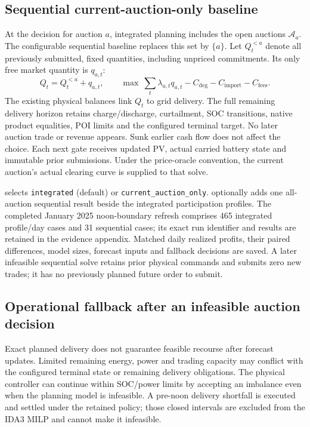 \documentclass[11pt,a4paper]{article}
\begin{document}
\subsection{Sequential current-auction-only baseline}

At the decision for auction $a$, integrated planning includes the open auctions
$\mathcal A_a$. The configurable sequential baseline replaces this set by
$\{a\}$. Let $Q_t^{<a}$ denote all previously submitted, fixed quantities,
including unpriced commitments. Its only free market quantity is $q_{a,t}$:
\begin{equation}
 Q_t=Q_t^{<a}+q_{a,t},\qquad
 \max\ \sum_t \lambda_{a,t}q_{a,t}
       -C_{\mathrm{deg}}-C_{\mathrm{import}}-C_{\mathrm{fees}}.
\end{equation}
The existing physical balances link $Q_t$ to grid delivery. The full remaining
delivery horizon retains charge/discharge, curtailment, SOC transitions, native
product equalities, POI limits and the configured terminal target. No later
auction trade or revenue appears. Sunk earlier cash flow does not affect the
choice. Each next gate receives updated PV, actual carried battery state and
immutable prior submissions. Under the price-oracle convention, the current
auction's actual clearing curve is supplied to that solve.

 selects
\texttt{integrated} (default) or \texttt{current\_auction\_only}.
 optionally adds
one all-auction sequential result beside the integrated participation profiles.
The completed January 2025 noon-boundary refresh comprises 465 integrated
profile/day cases and 31 sequential cases; its exact run identifier and results
are retained in the evidence appendix. Matched daily realized profits, their paired differences, model sizes,
forecast inputs and fallback decisions are saved. A later infeasible sequential
solve retains prior physical commands and submits zero new trades; it has no
previously planned future order to submit.

\subsection{Operational fallback after an infeasible auction decision}

Exact planned delivery does not guarantee feasible recourse after forecast
updates. Limited remaining energy, power and trading capacity may conflict with
the configured terminal state or remaining delivery obligations. The physical
controller can continue within SOC/power limits by accepting an imbalance even
when the planning model is infeasible. A pre-noon delivery shortfall is executed
and settled under the retained policy; those closed intervals are excluded from
the IDA3 MILP and cannot make it infeasible.
\end{document}
